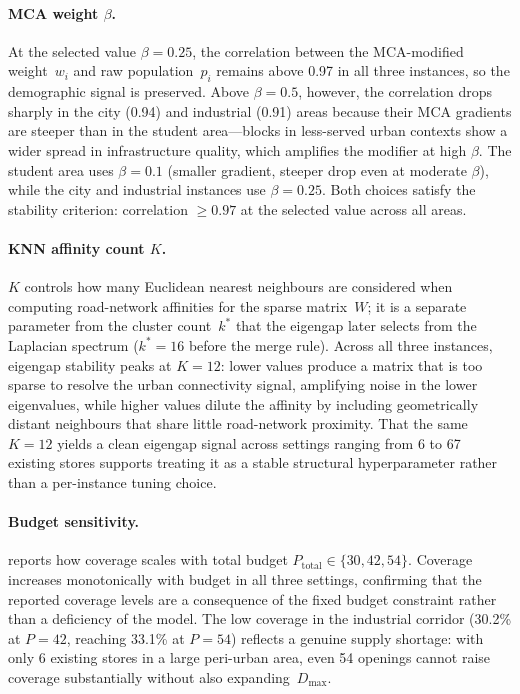 \paragraph{MCA weight $\beta$.}
At the selected value $\beta = 0.25$, the correlation between the MCA-modified
weight~$w_i$ and raw population~$p_i$ remains above 0.97 in all three
instances, so the demographic signal is preserved.
Above $\beta = 0.5$, however, the correlation drops sharply in the city
(0.94) and industrial (0.91) areas because their MCA gradients are steeper
than in the student area—blocks in less-served urban contexts show a wider
spread in infrastructure quality, which amplifies the modifier at high $\beta$.
The student area uses $\beta = 0.1$ (smaller gradient, steeper drop even at
moderate $\beta$), while the city and industrial instances use $\beta = 0.25$.
Both choices satisfy the stability criterion: correlation $\geq 0.97$ at
the selected value across all areas.

\paragraph{KNN affinity count $K$.}
$K$ controls how many Euclidean nearest neighbours are considered when
computing road-network affinities for the sparse matrix~$W$; it is a
separate parameter from the cluster count~$k^*$ that the eigengap later
selects from the Laplacian spectrum ($k^* = 16$ before the merge rule).
Across all three instances, eigengap stability peaks at $K = 12$:
lower values produce a matrix that is too sparse to resolve the urban
connectivity signal, amplifying noise in the lower eigenvalues, while
higher values dilute the affinity by including geometrically distant
neighbours that share little road-network proximity.
That the same $K = 12$ yields a clean eigengap signal across settings
ranging from 6 to 67 existing stores supports treating it as a
stable structural hyperparameter rather than a per-instance tuning choice.

\paragraph{Budget sensitivity.}
 reports how coverage scales with total budget
$P_{\text{total}} \in \{30, 42, 54\}$.
Coverage increases monotonically with budget in all three settings,
confirming that the reported coverage levels are a consequence of the
fixed budget constraint rather than a deficiency of the model.
The low coverage in the industrial corridor (30.2\% at $P = 42$,
reaching 33.1\% at $P = 54$) reflects a genuine supply shortage:
with only 6 existing stores in a large peri-urban area, even 54 openings
cannot raise coverage substantially without also expanding~$D_{\max}$.

